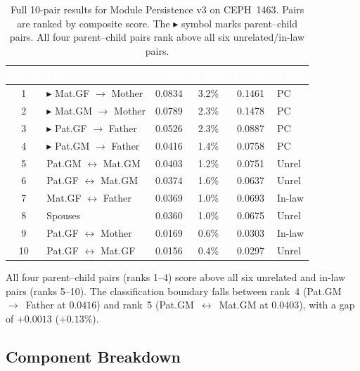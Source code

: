 \documentclass{../yalumba}
\begin{document}
\begin{table}[H]
\centering
\tablestyle
\caption{Full 10-pair results for Module Persistence v3 on CEPH~1463.
  Pairs are ranked by composite score.  The $\blacktriangleright$ symbol
  marks parent--child pairs.  All four parent--child pairs rank above all
  six unrelated/in-law pairs.}
\label{tab:full-scores}
\begin{tabular}{@{}clcccl@{}}
\toprule
\rowcolor{table-header}
\textcolor{white}{\textbf{Rank}} &
\textcolor{white}{\textbf{Pair}} &
\textcolor{white}{\textbf{Score}} &
\textcolor{white}{\textbf{Rarity}} &
\textcolor{white}{\textbf{Cosine}} &
\textcolor{white}{\textbf{Type}} \\
\midrule
1 & $\blacktriangleright$ Mat.GF $\to$ Mother
  & 0.0834 & 3.2\% & 0.1461 & PC \\
2 & $\blacktriangleright$ Mat.GM $\to$ Mother
  & 0.0789 & 2.3\% & 0.1478 & PC \\
3 & $\blacktriangleright$ Pat.GF $\to$ Father
  & 0.0526 & 2.3\% & 0.0887 & PC \\
4 & $\blacktriangleright$ Pat.GM $\to$ Father
  & 0.0416 & 1.4\% & 0.0758 & PC \\
\arrayrulecolor{yalumba-wine}\midrule\arrayrulecolor{black}
5 & Pat.GM $\leftrightarrow$ Mat.GM
  & 0.0403 & 1.2\% & 0.0751 & Unrel \\
6 & Pat.GF $\leftrightarrow$ Mat.GM
  & 0.0374 & 1.6\% & 0.0637 & Unrel \\
7 & Mat.GF $\leftrightarrow$ Father
  & 0.0369 & 1.0\% & 0.0693 & In-law \\
8 & Spouses
  & 0.0360 & 1.0\% & 0.0675 & Unrel \\
9 & Pat.GF $\leftrightarrow$ Mother
  & 0.0169 & 0.6\% & 0.0303 & In-law \\
10 & Pat.GF $\leftrightarrow$ Mat.GF
  & 0.0156 & 0.4\% & 0.0297 & Unrel \\
\bottomrule
\end{tabular}
\end{table}

\begin{keyfinding}
All four parent--child pairs (ranks 1--4) score above all six unrelated and
in-law pairs (ranks 5--10).  The classification boundary falls between
rank~4 (Pat.GM~$\to$~Father at $0.0416$) and rank~5
(Pat.GM~$\leftrightarrow$~Mat.GM at $0.0403$), with a gap of $+0.0013$
($+0.13\%$).
\end{keyfinding}

\subsection{Component Breakdown}
\end{document}
